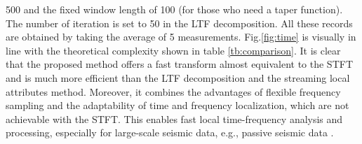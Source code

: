 500 and the fixed window length of 100 (for those who need a taper
function). The number of iteration is set to 50 in the LTF
decomposition. All these records are obtained by taking the average of
5 measurements. Fig.\ref{fig:time} is visually in line with the
theoretical complexity shown in table \ref{tb:comparison}. It is clear
that the proposed method offers a fast transform almost equivalent to
the STFT and is much more efficient than the LTF decomposition and the
streaming local attributes method. Moreover, it combines the
advantages of flexible frequency sampling and the adaptability of time
and frequency localization, which are not achievable with the
STFT. This enables fast local time-frequency analysis and processing,
especially for large-scale seismic data, e.g., passive seismic
data \cite[]{Geng24}.


